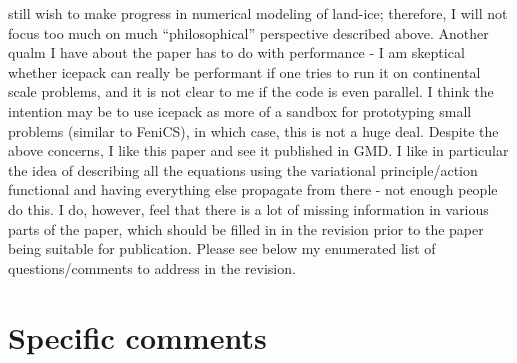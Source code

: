 \documentclass{article}
\theoremstyle{definition}
\theoremstyle{plain}
\begin{document}
{still wish to make progress in numerical modeling of land-ice; therefore, I will not focus too much on much
“philosophical” perspective described above.
Another qualm I have about the paper has to do with performance - I am skeptical whether icepack
can really be performant if one tries to run it on continental scale problems, and it is not clear to me if
the code is even parallel. I think the intention may be to use icepack as more of a sandbox for prototyping
small problems (similar to FeniCS), in which case, this is not a huge deal.
Despite the above concerns, I like this paper and see it published in GMD. I like in particular the
idea of describing all the equations using the variational principle/action functional and having everything
else propagate from there - not enough people do this. I do, however, feel that there is a lot of missing
information in various parts of the paper, which should be filled in in the revision prior to the paper being
suitable for publication. Please see below my enumerated list of questions/comments to address in the
revision.}

\section*{Specific comments}
\end{document}
